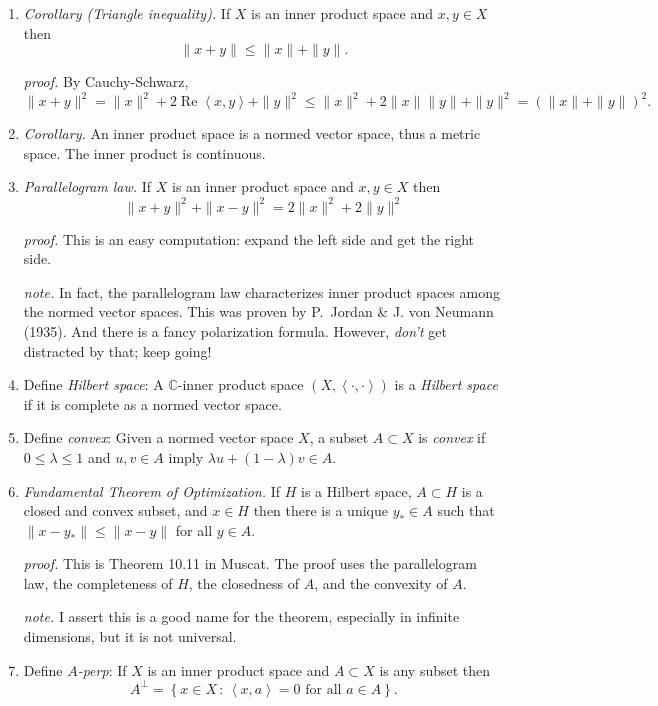 \documentclass[11pt]{article}
\newcommand{\CC}{\mathbb{C}}
\newcommand{\ip}[2]{\ensuremath{\left<#1,#2\right>}}
\begin{document}
\begin{enumerate}
\item \emph{Corollary (Triangle inequality).}  If $X$ is an inner product space and $x,y\in X$ then
    $$\|x+y\| \le \|x\|+\|y\|.$$

\emph{proof.} By Cauchy-Schwarz,
   $$\|x+y\|^2 = \|x\|^2 + 2 \operatorname{Re}\ip{x}{y} + \|y\|^2 \le \|x\|^2 + 2 \|x\|\|y\| + \|y\|^2 = \left(\|x\|+\|y\|\right)^2.$$

\item \emph{Corollary.}  An inner product space is a normed vector space, thus a metric space.  The inner product is continuous.

\item \emph{Parallelogram law.}  If $X$ is an inner product space and $x,y\in X$ then
    $$\|x+y\|^2 + \|x-y\|^2 = 2 \|x\|^2 + 2 \|y\|^2$$

\emph{proof.} This is an easy computation: expand the left side and get the right side.

\emph{note.}  In fact, the parallelogram law characterizes inner product spaces among the normed vector spaces.  This was proven by P.~Jordan \& J. von Neumann (1935).  And there is a fancy polarization formula. However, \emph{don't} get distracted by that; keep going!

\item Define \emph{Hilbert space}:  A $\CC$-inner product space $(X,\ip{\cdot}{\cdot})$ is a \emph{Hilbert space} if it is complete as a normed vector space.

\item Define \emph{convex}:  Given a normed vector space $X$, a subset $A\subset X$ is \emph{convex} if $0\le \lambda \le 1$ and $u,v\in A$ imply $\lambda u + (1-\lambda) v\in A$.

\item \emph{Fundamental Theorem of Optimization.}  If $H$ is a Hilbert space,  $A \subset H$ is a closed and convex subset, and $x\in H$ then there is a unique $y_* \in A$ such that $\|x-y_*\| \le \|x-y\|$ for all $y\in A$.

\emph{proof.}  This is Theorem 10.11 in Muscat.  The proof uses the parallelogram law, the completeness of $H$, the closedness of $A$, and the convexity of $A$.

\emph{note.}  I assert this is a good name for the theorem, especially in infinite dimensions, but it is not universal.

\item Define \emph{$A$-perp}:  If $X$ is an inner product space and $A\subset X$ is any subset then
    $$A^\perp = \left\{x\in X \,:\, \ip{x}{a}=0 \text{ for all } a \in A\right\}.$$


\end{enumerate}
\end{document}

